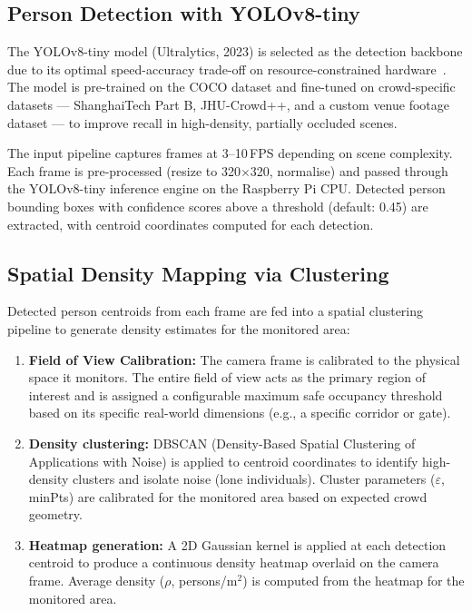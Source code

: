 \documentclass[12pt,a4paper]{article}
\begin{document}
\subsection{Person Detection with YOLOv8-tiny}

The YOLOv8-tiny model (Ultralytics, 2023) is selected as the detection backbone due to its optimal speed-accuracy trade-off on resource-constrained hardware~\cite{yolov8_edge_2026}. The model is pre-trained on the COCO dataset and fine-tuned on crowd-specific datasets — ShanghaiTech Part B, JHU-Crowd++, and a custom venue footage dataset — to improve recall in high-density, partially occluded scenes.

The input pipeline captures frames at 3--10\,FPS depending on scene complexity. Each frame is pre-processed (resize to 320$\times$320, normalise) and passed through the YOLOv8-tiny inference engine on the Raspberry Pi CPU. Detected person bounding boxes with confidence scores above a threshold (default: 0.45) are extracted, with centroid coordinates computed for each detection.

\subsection{Spatial Density Mapping via Clustering}

Detected person centroids from each frame are fed into a spatial clustering pipeline to generate density estimates for the monitored area:

\begin{enumerate}[leftmargin=1.5em, itemsep=3pt]
  \item \textbf{Field of View Calibration:} The camera frame is calibrated to the physical space it monitors. The entire field of view acts as the primary region of interest and is assigned a configurable maximum safe occupancy threshold based on its specific real-world dimensions (e.g., a specific corridor or gate).
  \item \textbf{Density clustering:} DBSCAN (Density-Based Spatial Clustering of Applications with Noise) is applied to centroid coordinates to identify high-density clusters and isolate noise (lone individuals). Cluster parameters ($\varepsilon$, minPts) are calibrated for the monitored area based on expected crowd geometry.
  \item \textbf{Heatmap generation:} A 2D Gaussian kernel is applied at each detection centroid to produce a continuous density heatmap overlaid on the camera frame. Average density ($\rho$, persons/m$^2$) is computed from the heatmap for the monitored area.
\end{enumerate}
\end{document}
